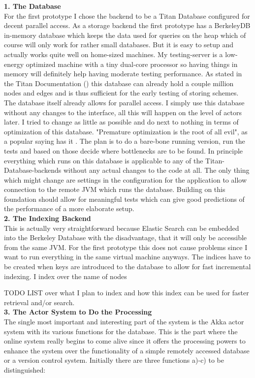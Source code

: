 \documentclass[11p]{scrartcl}
\begin{document}
\textbf{1. The Database}\\
For the first prototype I chose the backend to be a Titan Database configured for decent parallel access. As a storage backend the first prototype has a BerkeleyDB in-memory database which keeps the data used for queries on the heap which of course will only work for rather small databases. But it is easy to setup and actually works quite well on home-sized machines. My testing-server is a low-energy optimized machine with a tiny dual-core processor so having things in memory will definitely help having moderate testing performance. As stated in the Titan Documentation (\cite{link:titanWithBerkeley}) this database can already hold a couple million nodes and edges and is thus sufficient for the early testing of storing schemes. 
The database itself already allows for parallel access. I simply use this database without any changes to the interface, all this will happen on the level of actors later. I tried to change as little as possible and do next to nothing in terms of optimization of this database. "Premature optimization is the root of all evil", as a popular saying has it \cite{quote:rootEvil}. The plan is to do a bare-bone running version, run the tests and based on those decide where bottlenecks are to be found.
In principle everything which runs on this database is applicable to any of the Titan-Database-backends without any actual changes to the code at all. The only thing which might change are settings in the configuration for the application to allow connection to the remote JVM which runs the database.
Building on this foundation should allow for meaningful tests which can give good predictions of the performance of a more elaborate setup.\\

\textbf{2. The Indexing Backend}\\
This is actually very straightforward because Elastic Search can be embedded into the Berkeley Database with the disadvantage, that it will only be accessible from the same JVM. For the first prototype this does not cause problems since I want to run everything in the same virtual machine anyways. 
The indices have to be created when keys are introduced to the database to allow for fast incremental indexing. I index over the name of nodes 

TODO LIST over what I plan to index and how this index can be used for faster retrieval and/or search.	\\

\textbf{3. The Actor System to Do the Processing}\\	
The single most important and interesting part of the system is the Akka actor system with its various functions for the database. This is the part where the online system really begins to come alive since it offers the processing powers to enhance the system over the functionality of a simple remotely accessed database or a version control system. 
Initially there are three functions a)-c) to be distinguished:\\
\end{document}
